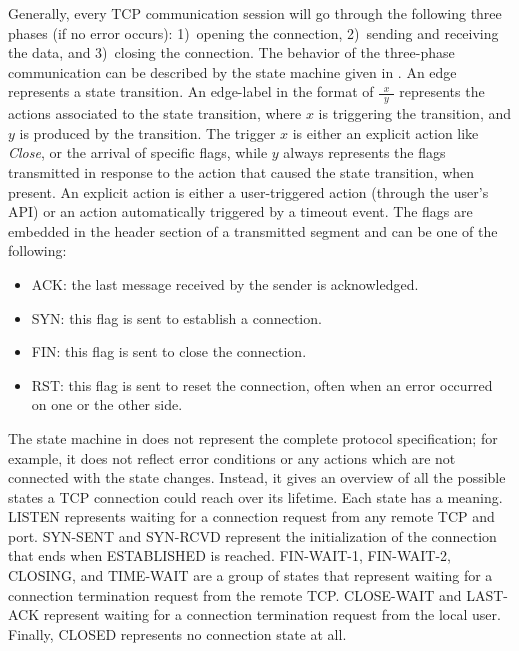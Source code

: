 \documentclass[conference]{IEEEtran}
\def\state#1{\textsf{\MakeUppercase{#1}}\xspace}
\def\sclosed{\state{closed}}
\def\ssynsent{\state{syn-sent}}
\def\ssynrcv{\state{syn-rcvd}}
\def\slisten{\state{listen}}
\def\sestab{\state{established}}
\def\sfwone{\state{fin-wait-1}}
\def\sfwtwo{\state{fin-wait-2}}
\def\sclosing{\state{closing}}
\def\sclosew{\state{close-wait}}
\def\slastack{\state{last-ack}}
\def\stimewait{\state{time-wait}}
\def\flag#1{\textsf{#1}\xspace}
\def\syn{\flag{SYN}}
\def\ack{\flag{ACK}}
\def\rst{\flag{RST}}
\def\fin{\flag{FIN}}
\begin{document}
Generally, every TCP communication session will go through the following three phases (if no error occurs): 1)~opening the connection, 2)~sending and receiving the data, and 3)~closing the connection. The behavior of the three-phase communication can be described by the state machine given in . An edge represents a state transition.
An edge-label in the format of $\frac{\ \ x \ \ }{\ \ y \ \ }$ represents the actions associated to the state transition, where $x$ is triggering the transition, and $y$ is produced by the transition.
The trigger $x$ is either an explicit action like \textit{Close}, or the arrival of specific flags, while $y$ always represents the flags transmitted in response to the action that caused the state transition, when present.
An explicit action is either a user-triggered action (through the user's API) or an action automatically triggered by a timeout event. The flags are embedded in the header section of a transmitted segment and can be one of the following:
\begin{itemize}
\item \ack: the last message received by the sender is acknowledged.
\item \syn: this flag is sent to establish a connection.
\item \fin: this flag is sent to close the connection.
\item \rst: this flag is sent to reset the connection, often when an error
occurred on one or the other side.
\end{itemize}

The state machine in  does not represent the complete protocol specification; for example, it does not reflect error conditions or any actions which are not connected with the state changes. Instead, it gives an overview of all the possible states a TCP connection could reach over its lifetime. Each state has a meaning. \slisten represents waiting for a connection request from any remote TCP and port. \ssynsent and \ssynrcv represent the initialization of the connection that ends when \sestab is reached. \sfwone, \sfwtwo, \sclosing, and \stimewait are a group of states that represent waiting for a connection termination request from the remote TCP. \sclosew and \slastack represent waiting for a connection termination request from the local user. Finally, \sclosed represents no connection state at all.

\end{document}

